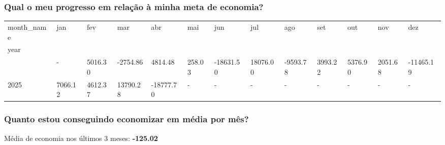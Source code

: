 \documentclass[
  8pt,
  a4paper,
  DIV=11,
  numbers=noendperiod]{scrartcl}
\begin{document}
\subsubsection{Qual o meu progresso em relação à minha meta de
economia?}\label{qual-o-meu-progresso-em-relauxe7uxe3o-uxe0-minha-meta-de-economia}

\begin{longtable}[]{@{}lllllllllllll@{}}
\toprule\noalign{}
month\_name & jan & fev & mar & abr & mai & jun & jul & ago & set & out
& nov & dez \\
year & & & & & & & & & & & & \\
\midrule\noalign{}
\endhead
\bottomrule\noalign{}
\endlastfoot
2024 & - & 5016.30 & -2754.86 & 4814.48 & 258.03 & -18631.50 & 18076.00
& -9593.78 & 3993.22 & 5376.90 & 2051.68 & -11465.19 \\
2025 & 7066.12 & 4612.37 & 13790.28 & -18777.70 & - & - & - & - & - & -
& - & - \\
\end{longtable}

\subsubsection{Quanto estou conseguindo economizar em média por
mês?}\label{quanto-estou-conseguindo-economizar-em-muxe9dia-por-muxeas}

Média de economia nos últimos 3 meses: \textbf{-125.02}
\end{document}
